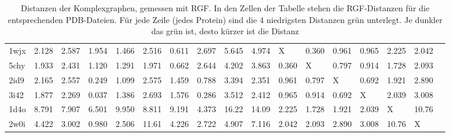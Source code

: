 \documentclass{report}
\begin{document}
\begin{table}
{\begin{tabular}{l l l l l l l l l l l l l l l l l}
1wjx & 2.128 & 2.587 & 1.954 & 1.466 & 2.516 & \cellcolor{fGreen!75}0.611 & 2.697 & 5.645 & 4.974 &   X   & \cellcolor{fGreen!100}0.360 & \cellcolor{fGreen!50}0.961 & \cellcolor{fGreen!25}0.965 & 2.225 & 2.042 &  \\
5chy & 1.933 & 2.431 & 1.120 & 1.291 & 1.971 & \cellcolor{fGreen!75}0.662 & 2.644 & 4.202 & 3.863 & \cellcolor{fGreen!100}0.360 &   X   & \cellcolor{fGreen!50}0.797 & \cellcolor{fGreen!25}0.914 & 1.728 & 2.093 &  \\
2id9 & 2.165 & 2.557 & \cellcolor{fGreen!100}0.249 & 1.099 & 2.575 & 1.459 & \cellcolor{fGreen!50}0.788 & 3.394 & 2.351 & 0.961 & \cellcolor{fGreen!25}0.797 &   X   & \cellcolor{fGreen!75}0.692 & 1.921 & 2.890 &  \\
3i42 & 1.877 & 2.269 & \cellcolor{fGreen!100}0.037 & 1.386 & 2.693 & 1.576 & \cellcolor{fGreen!75}0.286 & 3.512 & 2.412 & 0.965 & \cellcolor{fGreen!25}0.914 & \cellcolor{fGreen!50}0.692 &   X   & 2.039 & 3.008 &  \\
1d4o & 8.791 & 7.907 & 6.501 & 9.950 & 8.811 & 9.191 & 4.373 & 16.22 & 14.09 & \cellcolor{fGreen!25}2.225 & \cellcolor{fGreen!100}1.728 & \cellcolor{fGreen!75}1.921 & \cellcolor{fGreen!50}2.039 &   X   & 10.76 &  \\
2w0i & 4.422 & 3.002 & \cellcolor{fGreen!100}0.980 & \cellcolor{fGreen!25}2.506 & 11.61 & 4.226 & 2.722 & 4.907 & 7.116 & \cellcolor{fGreen!75}2.042 & \cellcolor{fGreen!50}2.093 & 2.890 & 3.008 & 10.76 &   X   &  \\



\end{tabular}}
\caption{Distanzen der Komplexgraphen, gemessen mit RGF. In den Zellen der Tabelle stehen die RGF-Distanzen f\"ur die entsprechenden PDB-Dateien. F\"ur jede Zeile (jedes Protein) sind die 4 niedrigsten Distanzen gr\"un unterlegt. Je dunkler das gr\"un ist, desto k\"urzer ist die Distanz}
\end{table}



\newpage
\end{document}

